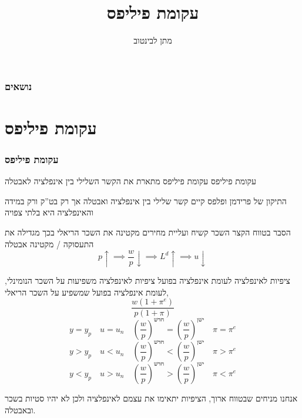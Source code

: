 \documentclass[usenames,dvipsnames]{beamer}
\title[]{עקומת פיליפס}
\author{מתן לבינטוב}
\institute[{{ אב"ג}}]{{ אוניברסיטת בן גוריון בנגב}}
\begin{document}
\begin{RTL}
\begin{frame}
\titlepage
\end{frame}
\begin{frame}
    \frametitle{נושאים}
    \tableofcontents

    

\end{frame}

\section{עקומת פיליפס}
\begin{frame}[allowframebreaks]
    \frametitle{עקומת פיליפס}
    \begin{block}{עקומת פיליפס}
        עקומת פיליפס מתארת את הקשר השלילי בין אינפלציה לאבטלה
    \end{block}

    \begin{exampleblock}{התיקון של פרידמן ופלפס}
        קיים קשר שלילי בין אינפלציה ואבטלה אך רק בט''ק ורק במידה והאינפלציה היא בלתי צפויה
    \end{exampleblock}
    \begin{block}{הסבר}
        בטווח הקצר השכר קשיח ועליית מחירים מקטינה את השכר הריאלי בכך מגדילה את התעסוקה / מקטינה אבטלה
        $$p \uparrow \implies \frac{w}{p} \downarrow \implies L^d \uparrow \implies u \downarrow$$
    \end{block}
    
    \framebreak

    \begin{block}{ציפיות לאינפלציה לעומת אינפלציה בפועל}
        ציפיות לאינפלציה משפיעות על השכר הנומינלי, לעומת אינפלציה בפועל שמשפיע על השכר הריאלי,
        $$\frac{w (1 + \pi^e)}{p (1 + \pi)}$$
        $$y = y_p \quad u = u_n \quad \left(\dfrac{w}{p}\right)^{\text{חדש}} = \left(\dfrac{w}{p}\right)^{\text{ישן}} \quad \pi = \pi^e$$
        $$y  > y_p \quad u < u_n \quad \left(\dfrac{w}{p}\right)^{\text{חדש}} < \left(\dfrac{w}{p}\right)^{\text{ישן}} \quad \pi > \pi^e$$
        $$y < y_p \quad u > u_n \quad \left(\dfrac{w}{p}\right)^{\text{חדש}} > \left(\dfrac{w}{p}\right)^{\text{ישן}} \quad \pi < \pi^e$$
    \end{block}

    אנחנו מניחים שבטווח ארוך, הציפיות יתאימו את עצמם לאינפלציה ולכן לא יהיו סטיות בשכר ובאבטלה.

\end{frame}


\end{RTL}
\end{document}
